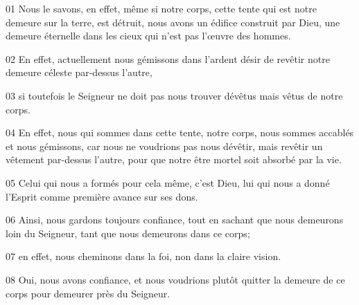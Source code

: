 01 Nous le savons, en effet, même si notre corps, cette tente qui est notre demeure sur la terre, est détruit, nous avons un édifice construit par Dieu, une demeure éternelle dans les cieux qui n’est pas l’œuvre des hommes.

02 En effet, actuellement nous gémissons dans l’ardent désir de revêtir notre demeure céleste par-dessus l’autre,

03 si toutefois le Seigneur ne doit pas nous trouver dévêtus mais vêtus de notre corps.

04 En effet, nous qui sommes dans cette tente, notre corps, nous sommes accablés et nous gémissons, car nous ne voudrions pas nous dévêtir, mais revêtir un vêtement par-dessus l’autre, pour que notre être mortel soit absorbé par la vie.

05 Celui qui nous a formés pour cela même, c’est Dieu, lui qui nous a donné l’Esprit comme première avance sur ses dons.

06 Ainsi, nous gardons toujours confiance, tout en sachant que nous demeurons loin du Seigneur, tant que nous demeurons dans ce corps;

07 en effet, nous cheminons dans la foi, non dans la claire vision.

08 Oui, nous avons confiance, et nous voudrions plutôt quitter la demeure de ce corps pour demeurer près du Seigneur.